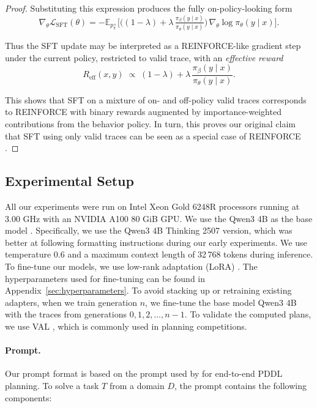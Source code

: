 \documentclass{article}
\renewcommand{\cite}[1]{\citep[][]{#1}}
\begin{document}
\begin{proof}
Substituting this expression produces the fully on-policy-looking form
\[
\nabla_\theta \mathcal{L}_{\mathrm{SFT}}(\theta)
=
-\mathbb{E}_{p_\pi^+}
\Big[
\big((1-\lambda)
+
\lambda\,\tfrac{\pi_\beta(y\mid x)}{\pi_\theta(y\mid x)}\big)
\,\nabla_\theta \log \pi_\theta(y\mid x)
\Big].
\]

Thus the SFT update may be interpreted as a REINFORCE-like gradient step under
the current policy, restricted to valid trace, with an \emph{effective
reward}
\[
R_{\mathrm{eff}}(x,y)
\;\propto\;
(1-\lambda)
+
\lambda\,\frac{\pi_\beta(y\mid x)}{\pi_\theta(y\mid x)}.
\]

This shows that SFT on a mixture of on- and off-policy valid traces corresponds
to REINFORCE with binary rewards augmented by importance-weighted contributions
from the behavior policy. In turn, this proves our original claim that SFT
using only valid traces can be seen as a special case of REINFORCE
\cite{williams-jml1992}.
\end{proof}



\subsection{Experimental Setup}
\label{sec:ExperimentalSetup}
All our experiments were run on Intel Xeon Gold 6248R processors running at
3.00 GHz with an NVIDIA A100 80 GiB GPU.
We use the Qwen3 4B as the base model \citep{qwen3-tr}. Specifically, we use the
Qwen3 4B Thinking 2507 version, which was better at following formatting
instructions during our early experiments. We use temperature $0.6$ and a
maximum context length of 32\,768 tokens during inference.
To fine-tune our models, we use low-rank adaptation (LoRA)
\citep{hu-et-al-iclr2022}. The hyperparameters used for fine-tuning can be found
in Appendix~\ref{sec:hyperparameters}. To avoid stacking up or retraining existing adapters,
when we train generation $n$, we fine-tune the base model Qwen3 4B with the
traces from generations $0, 1, 2, \dots, n-1$. To validate the computed plans, we use
VAL \citep{howey-long-icaps2003wscompetition}, which is commonly used in
planning competitions.


\paragraph{Prompt.}

Our prompt format is based on the prompt used by \citet{correa-et-al-neurips2025}
for end-to-end PDDL planning. To solve a task $T$ from a domain $D$, the
prompt contains the following components:
\end{document}
